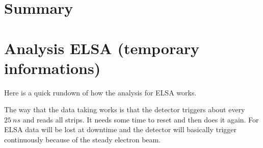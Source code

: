 \documentclass[sn-mathphys-num,iicol]{sn-jnl}
\theoremstyle{thmstyleone}
\theoremstyle{thmstyletwo}
\theoremstyle{thmstylethree}
\begin{document}


\section{Summary}


\clearpage
\section{Analysis ELSA (\textbf{temporary informations})}
Here is a quick rundown of how the analysis for ELSA works.

The way that the data taking works is that the detector triggers about every $\SI{25}{ns}$ and reads all strips.
It needs some time to reset and then does it again.
For ELSA data will be lost at downtime and the detector will basically trigger continuously because of the steady electron beam.
\end{document}
